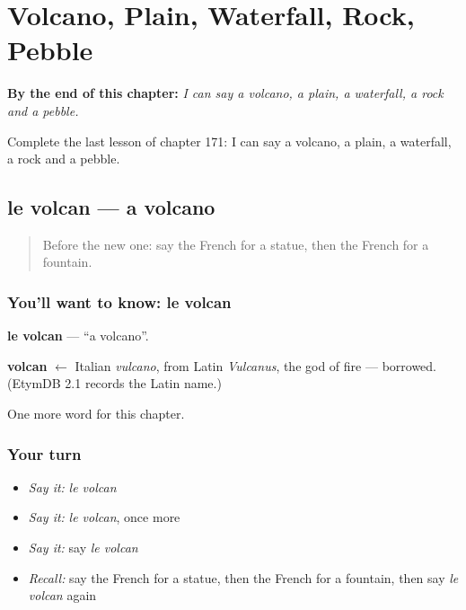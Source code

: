 
\chapter{Volcano, Plain, Waterfall, Rock, Pebble}
\label{ch:fr-volcano-plain-waterfall-rock-pebble}

\begin{chapteropening}
\textbf{By the end of this chapter:} \emph{I can say a volcano, a plain, a waterfall, a rock and a pebble.}

Complete the last lesson of chapter 171: I can say a volcano, a plain, a waterfall, a rock and a pebble.
\end{chapteropening}

\section[le volcan]{le volcan — a volcano}

\label{lesson:FR-C171-volcan}



\begin{quote}
Before the new one: say the French for a statue, then the French for a fountain.
\end{quote}

\subsection*{You'll want to know: le volcan}
\textbf{le volcan} — \textquotedblleft{}a volcano\textquotedblright{}.

\begin{cousinweb}
\textbf{volcan} $\leftarrow$ Italian \emph{vulcano}, from Latin \emph{Vulcanus}, the god of fire — borrowed. (EtymDB 2.1 records the Latin name.)
\end{cousinweb}

\begin{grammarlens}[title={What you've built}]
One more word for this chapter.
\end{grammarlens}

\subsection*{Your turn}
\begin{itemize}
\raggedright
  \item \emph{Say it:} \emph{le volcan}
  \item \emph{Say it:} \emph{le volcan}, once more
  \item \emph{Say it:} say \emph{le volcan}
  \item \emph{Recall:} say the French for a statue, then the French for a fountain, then say \emph{le volcan} again
\end{itemize}

